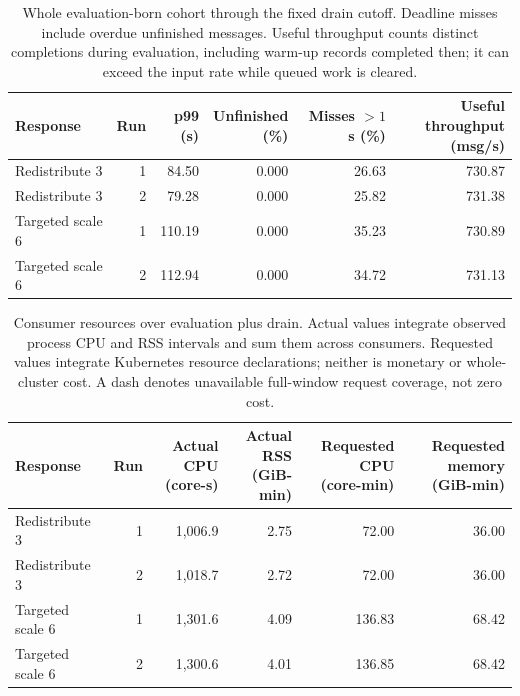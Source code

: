 \begin{table}[!htbp]
\centering\small
\setlength{\tabcolsep}{3pt}
\renewcommand{\arraystretch}{1.12}
\begin{tabular}{@{}lrrrrr@{}}
\toprule
Response & Run & \shortstack{p99\\(s)} & \shortstack{Unfinished\\(\%)} & \shortstack{Misses $>1$ s\\(\%)} & \shortstack{Useful throughput\\(msg/s)}\\
\midrule
Redistribute 3 & 1 & 84.50 & 0.000 & 26.63 & 730.87\\
Redistribute 3 & 2 & 79.28 & 0.000 & 25.82 & 731.38\\
Targeted scale 6 & 1 & 110.19 & 0.000 & 35.23 & 730.89\\
Targeted scale 6 & 2 & 112.94 & 0.000 & 34.72 & 731.13\\
\bottomrule
\end{tabular}
\caption{Whole evaluation-born cohort through the fixed drain cutoff. Deadline misses include overdue unfinished messages. Useful throughput counts distinct completions during evaluation, including warm-up records completed then; it can exceed the input rate while queued work is cleared.}
\label{tab:four-partition-outcomes}
\end{table}
\begin{table}[!htbp]
\centering\small
\setlength{\tabcolsep}{3pt}
\renewcommand{\arraystretch}{1.12}
\begin{tabular}{@{}lrrrrr@{}}
\toprule
Response & Run & \shortstack{Actual CPU\\(core-s)} & \shortstack{Actual RSS\\(GiB-min)} & \shortstack{Requested CPU\\(core-min)} & \shortstack{Requested memory\\(GiB-min)}\\
\midrule
Redistribute 3 & 1 & 1,006.9 & 2.75 & 72.00 & 36.00\\
Redistribute 3 & 2 & 1,018.7 & 2.72 & 72.00 & 36.00\\
Targeted scale 6 & 1 & 1,301.6 & 4.09 & 136.83 & 68.42\\
Targeted scale 6 & 2 & 1,300.6 & 4.01 & 136.85 & 68.42\\
\bottomrule
\end{tabular}
\caption{Consumer resources over evaluation plus drain. Actual values integrate observed process CPU and RSS intervals and sum them across consumers. Requested values integrate Kubernetes resource declarations; neither is monetary or whole-cluster cost. A dash denotes unavailable full-window request coverage, not zero cost.}
\label{tab:four-partition-resources}
\end{table}
